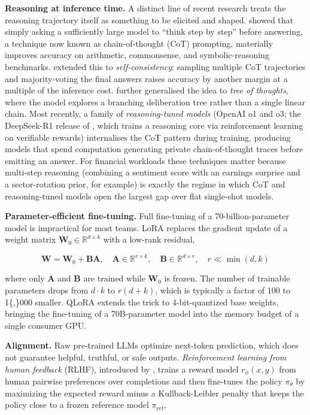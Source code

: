 \textbf{Reasoning at inference time.} A distinct line of recent research treats the reasoning trajectory itself as something to be elicited and shaped. \cite{wei2022cot} showed that simply asking a sufficiently large model to ``think step by step'' before answering, a technique now known as chain-of-thought (CoT) prompting, materially improves accuracy on arithmetic, commonsense, and symbolic-reasoning benchmarks. \cite{wang2023selfconsistency} extended this to \textit{self-consistency}: sampling multiple CoT trajectories and majority-voting the final answers raises accuracy by another margin at a multiple of the inference cost. \cite{yao2023treeofthoughts} further generalised the idea to \textit{tree of thoughts}, where the model explores a branching deliberation tree rather than a single linear chain. Most recently, a family of \textit{reasoning-tuned models} (OpenAI o1 and o3; the DeepSeek-R1 release of \cite{guo2025deepseekr1}, which trains a reasoning core via reinforcement learning on verifiable rewards) internalises the CoT pattern during training, producing models that spend computation generating private chain-of-thought traces before emitting an answer. For financial workloads these techniques matter because multi-step reasoning (combining a sentiment score with an earnings surprise and a sector-rotation prior, for example) is exactly the regime in which CoT and reasoning-tuned models open the largest gap over flat single-shot models.

\textbf{Parameter-efficient fine-tuning.} Full fine-tuning of a 70-billion-parameter model is impractical for most teams. LoRA \citep{hu2022lora} replaces the gradient update of a weight matrix $\mathbf{W}_0 \in \mathbb{R}^{d \times k}$ with a low-rank residual,

\begin{equation}
\mathbf{W} = \mathbf{W}_0 + \mathbf{B}\mathbf{A}, \quad \mathbf{A} \in \mathbb{R}^{r \times k}, \quad \mathbf{B} \in \mathbb{R}^{d \times r}, \quad r \ll \min(d, k)
\tag{23.2}
\end{equation}

where only $\mathbf{A}$ and $\mathbf{B}$ are trained while $\mathbf{W}_0$ is frozen. The number of trainable parameters drops from $d \cdot k$ to $r(d + k)$, which is typically a factor of 100 to 1\{,\}000 smaller. QLoRA \citep{dettmers2023qlora} extends the trick to 4-bit-quantized base weights, bringing the fine-tuning of a 70B-parameter model into the memory budget of a single consumer GPU.

\textbf{Alignment.} Raw pre-trained LLMs optimize next-token prediction, which does not guarantee helpful, truthful, or safe outputs. \textit{Reinforcement learning from human feedback} (RLHF), introduced by \cite{ouyang2022training}, trains a reward model $r_\phi(x, y)$ from human pairwise preferences over completions and then fine-tunes the policy $\pi_\theta$ by maximizing the expected reward minus a Kullback-Leibler penalty that keeps the policy close to a frozen reference model $\pi_{\text{ref}}$,

